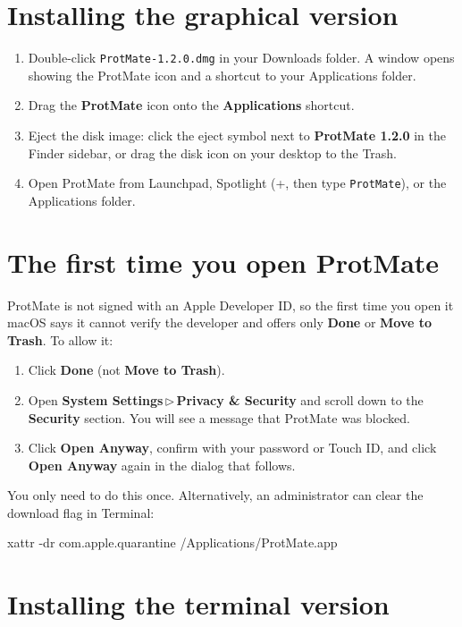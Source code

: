 \documentclass[11pt,a4paper,oneside]{report}
\newcommand{\pmversion}{1.2.0}
\newcommand{\cmd}[1]{\texttt{#1}}            %
\newcommand{\key}[1]{\fbox{\footnotesize\textsf{#1}}}
\newcommand{\gui}[1]{\textsf{\textbf{#1}}}  %
\newcommand{\menupath}[2]{\gui{#1}\,$\triangleright$\,\gui{#2}}
\begin{document}
\section{Installing the graphical version}

\begin{enumerate}
  \item Double-click \cmd{ProtMate-\pmversion.dmg} in your Downloads folder. A window opens
        showing the ProtMate icon and a shortcut to your Applications folder.
  \item Drag the \gui{ProtMate} icon onto the \gui{Applications} shortcut.
  \item Eject the disk image: click the eject symbol next to \gui{ProtMate \pmversion} in the
        Finder sidebar, or drag the disk icon on your desktop to the Trash.
  \item Open ProtMate from Launchpad, Spotlight (\key{Cmd}+\key{Space}, then type
        \cmd{ProtMate}), or the Applications folder.
\end{enumerate}

\section{The first time you open ProtMate}\label{sec:gatekeeper}

ProtMate is not signed with an Apple Developer ID, so the first time you open it macOS says it
cannot verify the developer and offers only \gui{Done} or \gui{Move to Trash}. To allow it:

\begin{enumerate}
  \item Click \gui{Done} (not \gui{Move to Trash}).
  \item Open \menupath{System Settings}{Privacy \& Security} and scroll down to the
        \gui{Security} section. You will see a message that ProtMate was blocked.
  \item Click \gui{Open Anyway}, confirm with your password or Touch ID, and click
        \gui{Open Anyway} again in the dialog that follows.
\end{enumerate}

You only need to do this once. Alternatively, an administrator can clear the download flag in
Terminal:

\begin{terminal}
xattr -dr com.apple.quarantine /Applications/ProtMate.app
\end{terminal}

\section{Installing the terminal version}
\end{document}
